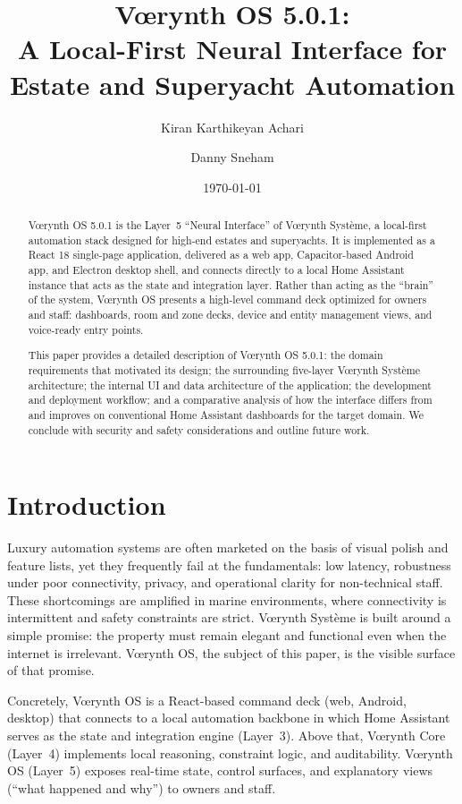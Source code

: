 \documentclass[11pt,a4paper]{article}
\title{Vœrynth OS 5.0.1:\\A Local-First Neural Interface for Estate and Superyacht Automation}
\author{Kiran Karthikeyan Achari \and Danny Sneham}
\date{\today}
\begin{document}
\maketitle
\tableofcontents
\newpage

\begin{abstract}
Vœrynth OS 5.0.1 is the Layer~5 ``Neural Interface'' of Vœrynth Système, a local-first automation stack designed for high-end estates and superyachts. It is implemented as a React 18 single-page application, delivered as a web app, Capacitor-based Android app, and Electron desktop shell, and connects directly to a local Home Assistant instance that acts as the state and integration layer. Rather than acting as the ``brain'' of the system, Vœrynth OS presents a high-level command deck optimized for owners and staff: dashboards, room and zone decks, device and entity management views, and voice-ready entry points.

This paper provides a detailed description of Vœrynth OS 5.0.1: the domain requirements that motivated its design; the surrounding five-layer Vœrynth Système architecture; the internal UI and data architecture of the application; the development and deployment workflow; and a comparative analysis of how the interface differs from and improves on conventional Home Assistant dashboards for the target domain. We conclude with security and safety considerations and outline future work.
\end{abstract}

\section{Introduction}
Luxury automation systems are often marketed on the basis of visual polish and feature lists, yet they frequently fail at the fundamentals: low latency, robustness under poor connectivity, privacy, and operational clarity for non-technical staff. These shortcomings are amplified in marine environments, where connectivity is intermittent and safety constraints are strict. Vœrynth Système is built around a simple promise: the property must remain elegant and functional even when the internet is irrelevant. Vœrynth OS, the subject of this paper, is the visible surface of that promise.

Concretely, Vœrynth OS is a React-based command deck (web, Android, desktop) that connects to a local automation backbone in which Home Assistant~\cite{home-assistant} serves as the state and integration engine (Layer~3). Above that, Vœrynth Core (Layer~4) implements local reasoning, constraint logic, and auditability. Vœrynth OS (Layer~5) exposes real-time state, control surfaces, and explanatory views (``what happened and why'') to owners and staff.
\end{document}
